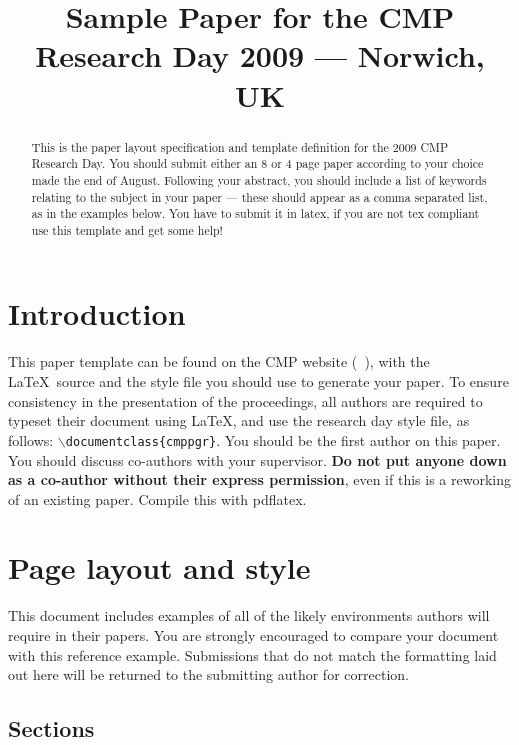 \documentclass{cmppgr}
\title{Sample Paper for the CMP Research Day 2009 --- Norwich, UK}
\begin{document}
\maketitle

\begin{abstract}

This is the paper layout specification and template definition for the 2009 CMP Research Day. You should submit either an 8 or 4 page paper according to your choice made the end of August. Following your abstract, you should include a list of keywords relating to the subject in your paper --- these should appear as a comma separated list, as in the examples below. You have to submit it in latex, if you are not tex compliant use this template and get some help!

\end{abstract}


\section{Introduction}

This paper template can be found on the CMP website (\texttt{  }), with  the \LaTeX\ source and the style file you should use to generate your paper. To ensure consistency in the presentation of the proceedings, all authors are required to typeset their document using \LaTeX, and use the research day style file, as follows: \texttt{$\backslash$documentclass\{cmppgr\}}. You should be the first author on this paper. You should discuss co-authors with your supervisor. {\bf Do not put anyone down as a co-author without their express permission}, even if this is a reworking of an existing paper. Compile this with pdflatex.

\section{Page layout and style}

This document includes examples of all of the likely environments authors will require in their papers. You are strongly encouraged to compare your document with this reference example. Submissions that do not match the formatting laid out here will be returned to the submitting author for correction.

\subsection{Sections}
\end{document}
